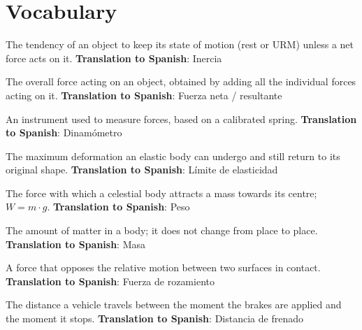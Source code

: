 \section{Vocabulary}

\begin{vocabulary}[Inertia]
    The tendency of an object to keep its state of motion (rest or URM) unless a net force acts on it. \newline
    \textbf{Translation to Spanish}: Inercia
\end{vocabulary}

\begin{vocabulary}
    The overall force acting on an object, obtained by adding all the individual forces acting on it. \newline
    \textbf{Translation to Spanish}: Fuerza neta / resultante
\end{vocabulary}

\begin{vocabulary}[Dynamometer]
    An instrument used to measure forces, based on a calibrated spring. \newline
    \textbf{Translation to Spanish}: Dinamómetro
\end{vocabulary}

\begin{vocabulary}
    The maximum deformation an elastic body can undergo and still return to its original shape. \newline
    \textbf{Translation to Spanish}: Límite de elasticidad
\end{vocabulary}

\begin{vocabulary}[Weight]
    The force with which a celestial body attracts a mass towards its centre; \(W = m \cdot g\). \newline
    \textbf{Translation to Spanish}: Peso
\end{vocabulary}

\begin{vocabulary}[Mass]
    The amount of matter in a body; it does not change from place to place. \newline
    \textbf{Translation to Spanish}: Masa
\end{vocabulary}

\begin{vocabulary}
    A force that opposes the relative motion between two surfaces in contact. \newline
    \textbf{Translation to Spanish}: Fuerza de rozamiento
\end{vocabulary}

\begin{vocabulary}
    The distance a vehicle travels between the moment the brakes are applied and the moment it stops. \newline
    \textbf{Translation to Spanish}: Distancia de frenado
\end{vocabulary}
